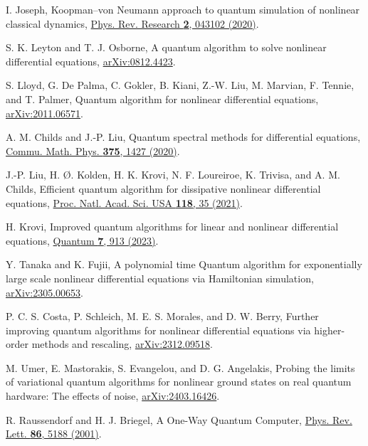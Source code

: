 \documentclass[aps,pra,twocolumn,floatfix,groupedaddress,superscriptaddress,nofootinbib,notitlepage]{revtex4-2}
\begin{document}
\begin{thebibliography}{100}
 I. Joseph, Koopman–von Neumann approach to quantum simulation of nonlinear classical dynamics, \href{https://doi.org/10.1103/PhysRevResearch.2.043102}{Phys. Rev. Research \textbf{2}, 043102 (2020)}.

 S. K. Leyton and T. J. Osborne, A quantum algorithm to solve nonlinear differential equations, \href{https://doi.org/10.48550/arXiv.0812.4423}{arXiv:0812.4423}.

 S. Lloyd, G. De Palma, C. Gokler, B. Kiani, Z.-W. Liu, M. Marvian, F. Tennie, and T. Palmer, Quantum algorithm for nonlinear differential equations, \href{https://doi.org/10.48550/arXiv.2011.06571}{arXiv:2011.06571}.

 A. M. Childs and J.-P. Liu, Quantum spectral methods for differential equations, \href{https://doi.org/10.1007/s00220-020-03699-z}{Commu. Math. Phys. \textbf{375}, 1427 (2020)}.

 J.-P. Liu, H. \O. Kolden, H. K. Krovi, N. F. Loureiroe, K. Trivisa, and A. M. Childs, Efficient quantum algorithm for dissipative nonlinear differential equations, \href{https://doi.org/10.1073/pnas.2026805118}{Proc. Natl. Acad. Sci. USA \textbf{118}, 35 (2021)}.

 H. Krovi, Improved quantum algorithms for linear and nonlinear differential equations, \href{https://doi.org/10.22331/q-2023-02-02-913}{Quantum \textbf{7}, 913 (2023)}.

 Y. Tanaka and K. Fujii, A polynomial time Quantum algorithm for exponentially large scale nonlinear differential equations via Hamiltonian simulation, \href{https://doi.org/10.48550/arXiv.2305.00653}{arXiv:2305.00653}.

 P. C. S. Costa, P. Schleich, M. E. S. Morales, and D. W. Berry, Further improving quantum algorithms for nonlinear differential equations via higher-order methods and rescaling, \href{https://doi.org/10.48550/arXiv.2312.09518}{arXiv:2312.09518}.

 M. Umer, E. Mastorakis, S. Evangelou, and D. G. Angelakis, Probing the limits of variational quantum algorithms for nonlinear ground states on real quantum hardware: The effects of noise, \href{https://doi.org/10.48550/arXiv.2403.16426}{arXiv:2403.16426}.

 R. Raussendorf and H. J. Briegel, A One-Way Quantum Computer, \href{https://doi.org/10.1103/PhysRevLett.86.5188}{Phys. Rev. Lett. \textbf{86}, 5188 (2001)}.


\end{thebibliography}
\end{document}
